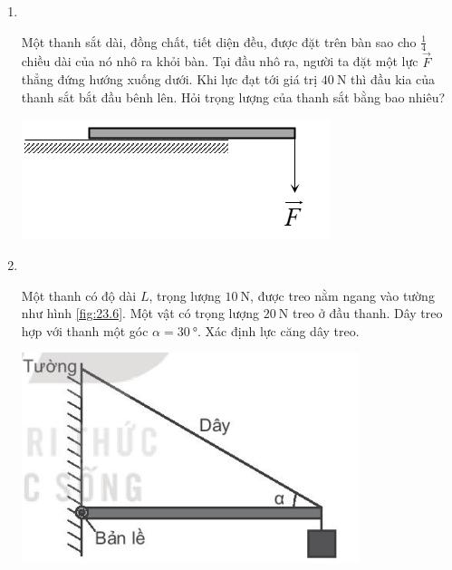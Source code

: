 \begin{enumerate}[label=\bfseries Câu \arabic*:, leftmargin=1.5cm]
\item{}\\
{Một thanh sắt dài, đồng chất, tiết diện đều, được đặt trên bàn sao cho $\frac{1}{4}$ chiều dài của nó nhô ra khỏi bàn. Tại đầu nhô ra, người ta đặt một lực $\vec F$ thẳng đứng hướng xuống dưới. Khi lực đạt tới giá trị $\SI{40}{\newton}$ thì đầu kia của thanh sắt bắt đầu bênh lên. Hỏi trọng lượng của thanh sắt bằng bao nhiêu?
	\begin{center}
		\includegraphics[width=0.4\linewidth]{../figs/VN10-2022-PH-TP023-P-10}
	\end{center}

}

\item {}\\
{Một thanh có độ dài $L$, trọng lượng $\SI{10}{\newton}$, được treo nằm ngang vào tường như hình \ref{fig:23.6}. Một vật có trọng lượng $\SI{20}{\newton}$ treo ở đầu thanh. Dây treo hợp với thanh một góc $\alpha=\SI{30}{\degree}$. Xác định lực căng dây treo.
	\begin{center}
		\includegraphics[width=0.4\linewidth]{../figs/VN10-2022-PH-TP023-P-6}
		\label{fig:23.6}
	\end{center}

}


\end{enumerate}
